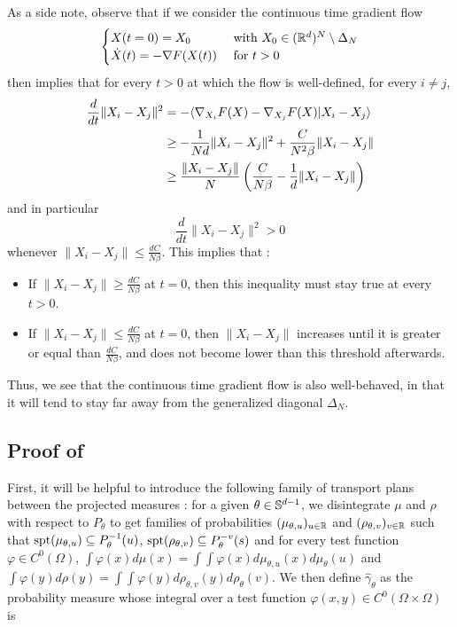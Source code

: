 As a side note, observe that if we consider the continuous time gradient flow
\begin{equation}
    \begin{cases}
    X(t = 0) = X_0 & \hbox{ with } X_0 \in (\mathbb R^d)^N \setminus \Delta_N \\
    \dot{X}(t) = -\nabla F(X(t)) & \hbox{ for } t > 0
\end{cases}
\end{equation}
then  implies that for every $t > 0$ at which the flow is well-defined, for every $i \neq j$,
\begin{align}
    \frac{d}{dt} \|X_i - X_j\|^2 &= -\langle\nabla_{X_i} F(X) - \nabla_{X_j} F(X)|X_i - X_j\rangle \\
    &\geq -\frac{1}{Nd} \|X_i - X_j\|^2 + \frac{C}{N^2\beta}\|X_i - X_j\| \\
    &\geq \frac{\|X_i - X_j\|}{N} \left(\frac{C}{N\beta} - \frac{1}{d}\|X_i - X_j\| \right)
\end{align}
and in particular
\begin{equation} \frac{d}{dt} \|X_i - X_j\|^2 > 0 \end{equation}
whenever $\|X_i - X_j\| \leq \frac{dC}{N\beta}$. This implies that :
\begin{itemize}
    \item If $\|X_i - X_j\| \geq \frac{dC}{N\beta}$ at $t = 0$, then this inequality must stay true at every $t > 0$.
    \item If $\|X_i - X_j\| \leq \frac{dC}{N\beta}$ at $t = 0$, then $\|X_i - X_j\|$ increases until it is greater or equal than $\frac{dC}{N\beta}$, and does not become lower than this threshold afterwards.
\end{itemize}
Thus, we see that the continuous time gradient flow is also well-behaved, in that it will tend to stay far away from the generalized diagonal $\Delta_N$.

\subsection{Proof of \texorpdfstring{}{}} \label{sec:proof_compatibility_with_discrete_case}

First, it will be helpful to introduce the following family of transport plans between the projected measures : for a given $\theta \in \mathbb S^{d-1}$, we disintegrate $\mu$ and $\rho$ with respect to $P_\theta$ to get families of probabilities $(\mu_{\theta,u})_{u\in \mathbb R}$ and $(\rho_{\theta,v})_{v\in \mathbb R}$ such that $\mathrm{spt} (\mu_{\theta,u}) \subseteq P_\theta^{-1}(u)$, $\mathrm{spt} (\rho_{\theta,v}) \subseteq P_\theta^{-v}(s)$ and for every test function $\varphi \in C^0(\Omega)$, $\int \varphi(x) d\mu(x) = \int \int \varphi(x) d\mu_{\theta,u}(x) d\mu_\theta(u)$ and $\int \varphi(y) d\rho(y) = \int \int \varphi(y) d\rho_{\theta,v}(y) d\rho_\theta(v)$. We then define $\hat{\gamma}_\theta$ as the probability measure whose integral over a test function $\varphi(x,y) \in C^0(\Omega \times \Omega)$ is

